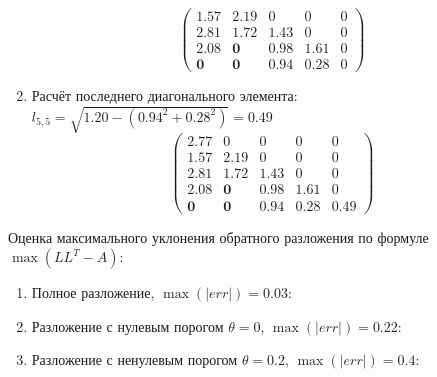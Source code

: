 \begin{multicols}{3}
\begin{enumerate}
$$\begin{pmatrix}
        1.57       & 2.19       & 0    & 0    & 0 \\
        2.81       & 1.72       & 1.43 & 0    & 0 \\
        2.08       & \mathbf{0} & 0.98 & 1.61 & 0 \\
        \mathbf{0} & \mathbf{0} & 0.94 & 0.28 & 0
    \end{pmatrix}$$
    \vspace{-0.5cm}
    \item Расчёт последнего диагонального элемента: $l_{5,5} = \sqrt{1.20 - (0.94^2 + 0.28^2)} = 0.49$
    $$\begin{pmatrix}
        2.77       & 0          & 0    & 0    & 0    \\
        1.57       & 2.19       & 0    & 0    & 0    \\
        2.81       & 1.72       & 1.43 & 0    & 0    \\
        2.08       & \mathbf{0} & 0.98 & 1.61 & 0    \\
        \mathbf{0} & \mathbf{0} & 0.94 & 0.28 & 0.49
    \end{pmatrix}$$
    \end{enumerate}
\end{multicols}
Оценка максимального уклонения обратного разложения по формуле $\max(LL^T - A)$:
\begin{enumerate}
    \item Полное разложение, $\max(|err|) = 0.03$:

    \item Разложение с нулевым порогом $\theta=0$, $\max(|err|) = 0.22$:

    \item Разложение с ненулевым порогом $\theta=0.2$, $\max(|err|) = 0.4$:
\end{enumerate}
